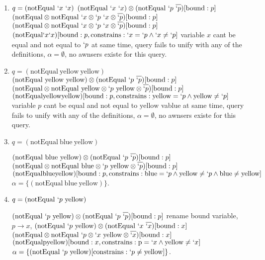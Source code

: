 \documentclass[11pt,a4paper]{report}
\newcommand{\var}[1]{`#1}
\newcommand{\unify}{\otimes}
\begin{document}
\begin{enumerate}
\item $q = (\text{notEqual}\ \var{x}\ \var{x})$
\subitem $(\text{notEqual}\ \var{x}\ \var{x}) \unify (\text{notEqual}\ \var{p}\ \overline{\var{p}})[\text{bound}: p]$
\subitem $(\text{notEqual} \unify \text{notEqual}\ \var{x} \unify \var{p}\ \var{x} \unify \overline{\var{p}})[\text{bound}: p]$ 
\subitem $(\text{notEqual} \unify \text{notEqual}\ \var{x} \unify \var{p}\ \var{x} \unify \overline{\var{p}})[\text{bound}: p]$ 
\subitem $(\text{notEqual} \var{x} \var{x})[\text{bound}: p, \text{constrains}: \var{x}=\var{p} \wedge \var{x} \neq \var{p}]$
\subitem variable $x$ cant be equal and not equal to $\var{p}$ at same time,
\subitem query fails to unify with any of the definitions,
\subitem $\alpha=\emptyset$, no awnsers existe for this query.

\item $q = (\text{notEqual}\  \text{yellow}\ \text{yellow})$
\subitem $(\text{notEqual}\ \text{yellow}\ \text{yellow}) \unify (\text{notEqual}\ \var{p}\ \overline{\var{p}})[\text{bound}: p]$
\subitem $(\text{notEqual} \unify \text{notEqual}\ \text{yellow} \unify \var{p}\ \text{yellow} \unify \overline{\var{p}})[\text{bound}: p]$ 
\subitem $(\text{notEqual} \text{yellow} \text{yellow})[\text{bound}: p, \text{constrains}: \text{yellow}=\var{p} \wedge \text{yellow} \neq \var{p}]$
\subitem variable $p$ cant be equal and not equal to $\text{yellow}$ vablue at same time,
\subitem query fails to unify with any of the definitions,
\subitem $\alpha=\emptyset$, no awnsers existe for this query.

\item $q = (\text{notEqual}\  \text{blue}\ \text{yellow})$

\subitem $(\text{notEqual}\ \text{blue}\ \text{yellow}) \unify (\text{notEqual}\ \var{p}\ \overline{\var{p}})[\text{bound}: p]$
\subitem $(\text{notEqual} \unify \text{notEqual}\ \text{blue} \unify \var{p}\ \text{yellow} \unify \overline{\var{p}})[\text{bound}: p]$ 
\subitem $(\text{notEqual} \text{blue} \text{yellow})[\text{bound}: p, \text{constrains}: \text{blue}=\var{p} \wedge \text{yellow} \neq \var{p} \wedge \text{blue} \neq \text{yellow}]$
\subitem $\alpha=\{(\text{notEqual}\  \text{blue}\ \text{yellow})\}$.

\item $q = (\text{notEqual}\ \var{p}\ \text{yellow})$

\subitem $(\text{notEqual}\ \var{p}\ \text{yellow}) \unify (\text{notEqual}\ \var{p}\ \overline{\var{p}})[\text{bound}: p]$
\subitem rename bound variable, $p \rightarrow x$, 
\subitem $(\text{notEqual}\ \var{p}\ \text{yellow}) \unify (\text{notEqual}\ \var{x}\ \overline{\var{x}})[\text{bound}: x]$
\subitem $(\text{notEqual} \unify \text{notEqual}\ \var{p} \unify \var{x}\ \text{yellow} \unify \overline{\var{x}})[\text{bound}: x]$ 
\subitem $(\text{notEqual} \text{p} \text{yellow})[\text{bound}: x, \text{constrains}: \text{p}=\var{x} \wedge \text{yellow} \neq \var{x}]$
\subitem $\alpha=\{(\text{notEqual}\  \var{p}\ \text{yellow})[\text{constrains}: \var{p} \neq \text{yellow}]\}$.

\end{enumerate}
\end{document}
